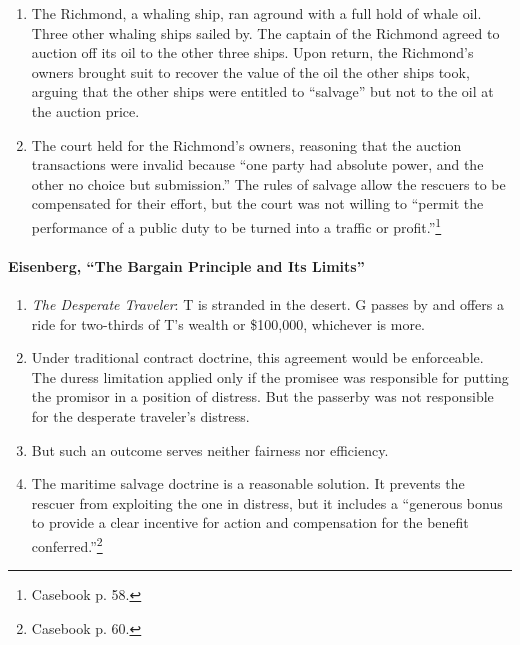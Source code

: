 \begin{enumerate}
    \item The Richmond, a whaling ship, ran aground with a full hold of whale 
    oil. Three other whaling ships sailed by. The captain of the Richmond 
    agreed to auction off its oil to the other three ships. Upon return, the 
    Richmond's owners brought suit to recover the value of the oil the other 
    ships took, arguing that the other ships were entitled to ``salvage'' but 
    not to the oil at the auction price.
    \item The court held for the Richmond's owners, reasoning that the auction 
    transactions were invalid because ``one party had absolute power, and the 
    other no choice but submission.'' The rules of salvage allow the rescuers 
    to be compensated for their effort, but the court was not willing to 
    ``permit the performance of a public duty to be turned into a traffic or 
    profit.''\footnote{Casebook p. 58.}
\end{enumerate}

\paragraph{Eisenberg, ``The Bargain Principle and Its Limits''}

\begin{enumerate}
    \item \emph{The Desperate Traveler}: T is stranded in the desert. G passes 
    by and offers a ride for two-thirds of T's wealth or \$100,000, whichever 
    is more.
    \item Under traditional contract doctrine, this agreement would be 
    enforceable. The duress limitation applied only if the promisee was 
    responsible for putting the promisor in a position of distress. But the 
    passerby was not responsible for the desperate traveler's distress.
    \item But such an outcome serves neither fairness nor efficiency.
    \item The maritime salvage doctrine is a reasonable solution. It prevents 
    the rescuer from exploiting the one in distress, but it includes a 
    ``generous bonus to provide a clear incentive for action and compensation 
    for the benefit conferred.''\footnote{Casebook p. 60.}
\end{enumerate}

% 
% 
% 
% 


